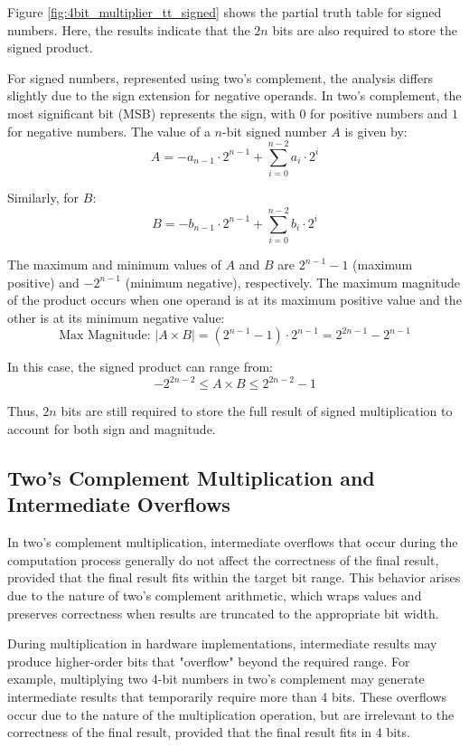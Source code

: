 Figure \ref{fig:4bit_multiplier_tt_signed} shows the partial truth table for signed numbers. Here, the results indicate that the $2n$ bits are also required to store the signed product. 

For signed numbers, represented using two's complement, the analysis differs slightly due to the sign extension for negative operands. In two's complement, the most significant bit (MSB) represents the sign, with $0$ for positive numbers and $1$ for negative numbers. The value of a $n$-bit signed number $A$ is given by:
\[
A = -a_{n-1} \cdot 2^{n-1} + \sum_{i=0}^{n-2} a_i \cdot 2^i
\]

Similarly, for $B$:
\[
B = -b_{n-1} \cdot 2^{n-1} + \sum_{i=0}^{n-2} b_i \cdot 2^i
\]

The maximum and minimum values of $A$ and $B$ are $2^{n-1} - 1$ (maximum positive) and $-2^{n-1}$ (minimum negative), respectively. The maximum magnitude of the product occurs when one operand is at its maximum positive value and the other is at its minimum negative value:
\[
\text{Max Magnitude: } |A \times B| = (2^{n-1} - 1) \cdot 2^{n-1} = 2^{2n-1} - 2^{n-1}
\]

In this case, the signed product can range from:
\[
-2^{2n-2} \leq A \times B \leq 2^{2n-2} - 1
\]

Thus, $2n$ bits are still required to store the full result of signed multiplication to account for both sign and magnitude.

\subsection{Two's Complement Multiplication and Intermediate Overflows}

In two's complement multiplication, intermediate overflows that occur during the computation process generally do not affect the correctness of the final result, provided that the final result fits within the target bit range. This behavior arises due to the nature of two's complement arithmetic, which wraps values and preserves correctness when results are truncated to the appropriate bit width.

During multiplication in hardware implementations, intermediate results may produce higher-order bits that "overflow" beyond the required range. For example, multiplying two 4-bit numbers in two's complement may generate intermediate results that temporarily require more than 4 bits. These overflows occur due to the nature of the multiplication operation, but are irrelevant to the correctness of the final result, provided that the final result fits in 4 bits.

